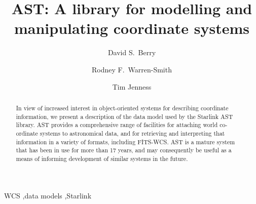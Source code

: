 \documentclass[final,authoryear,5p,times,twocolumn]{elsarticle}
\begin{document}
\begin{frontmatter}



\title{AST: A library for modelling and manipulating coordinate systems}


\author[jac,eao]{David S.\ Berry}
\author[ral]{Rodney F.\ Warren-Smith}
\author[jac,lsst]{Tim Jenness}


\address[jac]{Joint Astronomy Centre, 660 N.\ A`oh\=ok\=u Place, Hilo, HI
  96720, USA}
\address[eao]{East Asian Observatory, 660 N.\ A`oh\=ok\=u Place, Hilo, HI
  96720, USA}
\address[ral]{RAL Space, STFC Rutherford Appleton Laboratory, Harwell Oxford, Didcot, Oxfordshire OX11 0QX, UK}
\address[lsst]{LSST Project Office, 933 N.\ Cherry Ave, Tucson, AZ~85721, USA}


\begin{abstract}
In view of increased interest in object-oriented systems for describing
coordinate information, we present a description of the data model used
by the Starlink AST library. AST provides a comprehensive range of
facilities for attaching world co-ordinate systems to astronomical data,
and for retrieving and interpreting that information in a variety of
formats, including FITS-WCS. AST is a mature system that has been in use
for more than 17 years, and may consequently be useful as a means of
informing development of similar systems in the future.
\end{abstract}

\begin{keyword}


WCS \sep data models \sep Starlink

\end{keyword}

\end{frontmatter}
\end{document}
